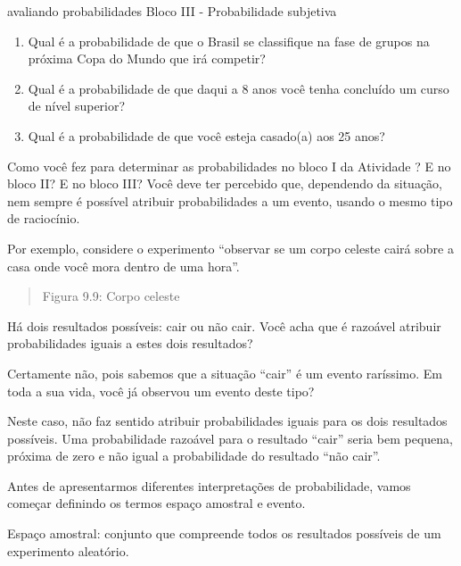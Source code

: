 \begin{task}{avaliando probabilidades}
Bloco III - Probabilidade subjetiva
\begin{enumerate}
\item {} 
Qual é a probabilidade de que o Brasil se classifique na fase de grupos na próxima Copa do Mundo que irá competir?

\item {} 
Qual é a probabilidade de que daqui a 8 anos você tenha concluído um curso de nível superior?

\item {} 
Qual é a probabilidade de que você esteja casado(a) aos 25 anos?

\end{enumerate}
\end{task}


\label{\detokenize{PE511-1:sec-interpretacoes}}\label{\detokenize{PE511-1:organizando-as-ideias-probabilidade-conceitos-basicos}}\label{\detokenize{PE511-1::doc}}
Como você fez para determinar as probabilidades no bloco I da Atividade ? E no bloco II? E no bloco III? Você deve ter percebido que, dependendo da situação, nem sempre é possível atribuir probabilidades a um evento, usando o mesmo tipo de raciocínio.

Por exemplo, considere o experimento “observar se um corpo celeste cairá sobre a casa onde você mora dentro de uma hora”.
\begin{quote}

\begin{figure}[H]
\centering

\noindent{}
\end{figure}

Figura 9.9: Corpo celeste
\end{quote}

Há dois resultados possíveis: cair ou não cair. Você acha que é razoável atribuir probabilidades iguais a estes dois resultados?

Certamente não, pois sabemos que a situação “cair” é um evento raríssimo. Em toda a sua vida, você já observou um evento deste tipo?

Neste caso, não faz sentido atribuir probabilidades iguais para os dois resultados possíveis. Uma probabilidade razoável para o resultado “cair” seria bem pequena, próxima de zero e não igual a probabilidade do resultado “não cair”.

Antes de apresentarmos diferentes interpretações de probabilidade, vamos começar definindo os termos espaço amostral e evento.
\begin{description}
\item[{Espaço amostral: conjunto que compreende todos os resultados possíveis de um experimento aleatório.}] \leavevmode{}\label{\detokenize{PE511-1:term-espaco-amostral-conjunto-que-compreende-todos-os-resultados-possiveis-de-um-experimento-aleatorio}}
\end{description}

